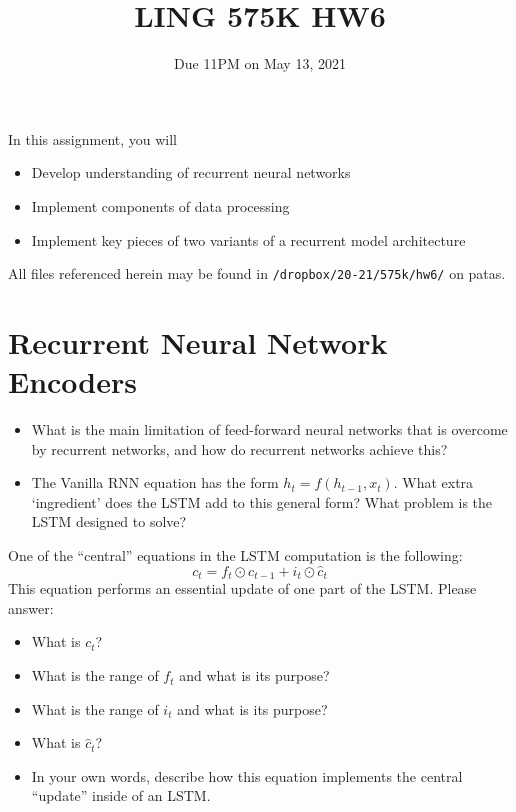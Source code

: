 \documentclass[11pt]{article}
\begin{document}
\title{LING 575K HW6}
\date{\vspace{-0.2in}Due 11PM on May 13, 2021}
\maketitle


\noindent In this assignment, you will 
\begin{itemize}
  \item Develop understanding of recurrent neural networks
  \item Implement components of data processing 
  \item Implement key pieces of two variants of a recurrent model architecture
\end{itemize}
All files referenced herein may be found in \texttt{/dropbox/20-21/575k/hw6/} on patas.


\section{Recurrent Neural Network Encoders}

\begin{itemize}
  \item What is the main limitation of feed-forward neural networks that is overcome by recurrent networks, and how do recurrent networks achieve this?
  \item The Vanilla RNN equation has the form $h_t = f(h_{t-1}, x_t)$.  What extra `ingredient' does the LSTM add to this general form?  What problem is the LSTM designed to solve?
\end{itemize}

\vspace{2em}
  One of the ``central'' equations in the LSTM computation is the following:
\[ c_t = f_t \odot c_{t-1} + i_t \odot \hat{c}_t \]
This equation performs an essential update of one part of the LSTM.  Please answer:
\begin{itemize}
  \item What is $c_t$?
  \item What is the range of $f_t$ and what is its purpose?
  \item What is the range of $i_t$ and what is its purpose?
  \item What is $\hat{c}_t$?
  \item In your own words, describe how this equation implements the central ``update'' inside of an LSTM.
\end{itemize}
\end{document}
